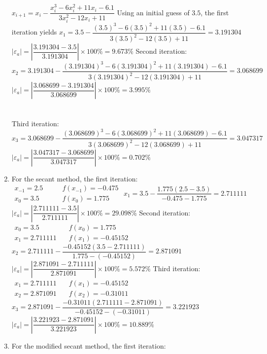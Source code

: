 \documentclass[../main.tex]{subfiles}
\begin{document}
\begin{enumerate}[label=\bfseries(\alph*)]
$x_{i+1}=x_{i}-\dfrac{x_{i}^{3}-6 x_{i}^{2}+11 x_{i}-6.1}{3 x_{i}^{2}-12 x_{i}+11}$
\bigbreak
Using an initial guess of $3.5$, the first iteration yields
\bigbreak
$x_{1}=3.5-\dfrac{(3.5)^{3}-6(3.5)^{2}+11(3.5)-6.1}{3(3.5)^{2}-12(3.5)+11}=3.191304$
\bigbreak
$\left|\varepsilon_{a}\right|=\left|\dfrac{3.191304-3.5}{3.191304}\right| \times 100 \%=9.673 \%$
\bigbreak
Second iteration:
\bigbreak
$x_{2}=3.191304-\dfrac{(3.191304)^{3}-6(3.191304)^{2}+11(3.191304)-6.1}{3(3.191304)^{2}-12(3.191304)+11}=3.068699$
\bigbreak
$\left|\varepsilon_{a}\right|=\left|\dfrac{3.068699-3.191304}{3.068699}\right| \times 100 \%=3.995 \%$\\\\\\ Third iteration:
\bigbreak
$x_{3}=3.068699-\dfrac{(3.068699)^{3}-6(3.068699)^{2}+11(3.068699)-6.1}{3(3.068699)^{2}-12(3.068699)+11}=3.047317$
\bigbreak
$\left|\varepsilon_{a}\right|=\left|\dfrac{3.047317-3.068699}{3.047317}\right| \times 100 \%=0.702 \%$
\bigbreak
\item For the secant method, the first iteration:
\bigbreak
$\begin{array}{ll}x_{-1}=2.5 &\quad\quad f\left(x_{-1}\right)=-0.475 \\ x_{0}=3.5 &\quad\quad f\left(x_{0}\right)=1.775\end{array}$
\bigbreak
$x_{1}=3.5-\dfrac{1.775(2.5-3.5)}{-0.475-1.775}=2.711111$
\bigbreak
$\left|\varepsilon_{a}\right|=\left|\dfrac{2.711111-3.5}{2.711111}\right| \times 100 \%=29.098 \%$
\bigbreak
Second iteration:
\bigbreak
$\begin{array}{ll}x_{0}=3.5 &\quad f\left(x_{0}\right)=1.775 \\ x_{1}=2.711111 &\quad f\left(x_{1}\right)=-0.45152\end{array}$
\bigbreak
$x_{2}=2.711111-\dfrac{-0.45152(3.5-2.711111)}{1.775-(-0.45152)}=2.871091$
\bigbreak
$\left|\varepsilon_{a}\right|=\left|\dfrac{2.871091-2.711111}{2.871091}\right| \times 100 \%=5.572 \%$
\bigbreak
Third iteration:
\bigbreak
$\begin{array}{ll}x_{1}=2.711111 &\quad f\left(x_{1}\right)=-0.45152 \\ x_{2}=2.871091 &\quad f\left(x_{2}\right)=-0.31011\end{array}$
\bigbreak
$x_{3}=2.871091-\dfrac{-0.31011(2.711111-2.871091)}{-0.45152-(-0.31011)}=3.221923$
\bigbreak
$\left|\varepsilon_{a}\right|=\left|\dfrac{3.221923-2.871091}{3.221923}\right| \times 100 \%=10.889 \%$
\bigbreak
\item For the modified secant method, the first iteration:

\end{enumerate}
\end{document}
